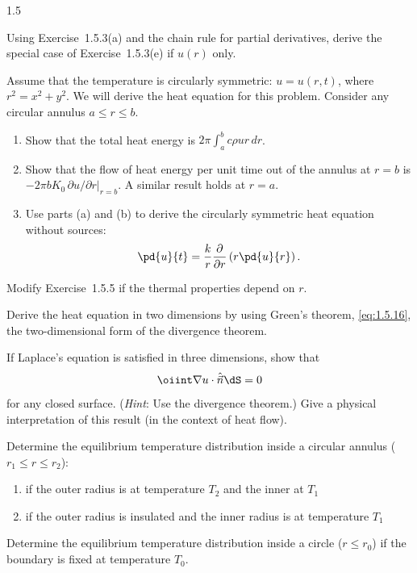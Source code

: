 \begin{exercises}{1.5}
\item Using Exercise~1.5.3(a) and the chain rule for partial derivatives, derive the special case of Exercise~1.5.3(e) if $u(r)$ only.

\item Assume that the temperature is circularly symmetric: $u = u(r,t)$, where $r^2 = x^2 + y^2$. We will derive the heat equation for this problem. Consider any circular annulus $a \le r \le b$.
\begin{enumerate}
\item[(a)] Show that the total heat energy is $2\pi\int_a^b c\rho u r\,dr$.
\item[(b)] Show that the flow of heat energy per unit time out of the annulus at $r = b$ is $-2\pi b K_0\,\partial u/\partial r\big|_{r=b}$. A similar result holds at $r = a$.
\item[(c)] Use parts (a) and (b) to derive the circularly symmetric heat equation without sources:
\[
\pd{u}{t} = \frac{k}{r}\frac{\partial}{\partial r}\left(r\pd{u}{r}\right).
\]
\end{enumerate}

\item Modify Exercise~1.5.5 if the thermal properties depend on $r$.

\item Derive the heat equation in two dimensions by using Green's theorem, \eqref{eq:1.5.16}, the two-dimensional form of the divergence theorem.

\item If Laplace's equation is satisfied in three dimensions, show that
\[
\oiint \nabla u\cdot\hat{\vec{n}}\dS = 0
\]
for any closed surface. (\emph{Hint}: Use the divergence theorem.) Give a physical interpretation of this result (in the context of heat flow).

\item Determine the equilibrium temperature distribution inside a circular annulus ($r_1 \le r \le r_2$):
\begin{enumerate}
\item[\starred (a)] if the outer radius is at temperature $T_2$ and the inner at $T_1$
\item[(b)] if the outer radius is insulated and the inner radius is at temperature $T_1$
\end{enumerate}

\item Determine the equilibrium temperature distribution inside a circle ($r \le r_0$) if the boundary is fixed at temperature $T_0$.


\end{exercises}
